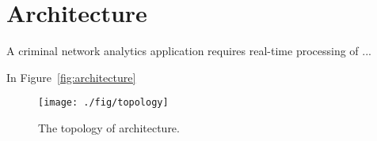 \section{Architecture}
\label{sec:architecture}

A criminal network analytics application requires real-time processing of ...

 

\lipsum[1]

In Figure~\ref{fig:architecture}

\begin{figure*}
\centering
\texttt{[image: ./fig/topology]}
\caption{The topology of architecture.}
\label{fig:toplogy}
\end{figure*}

